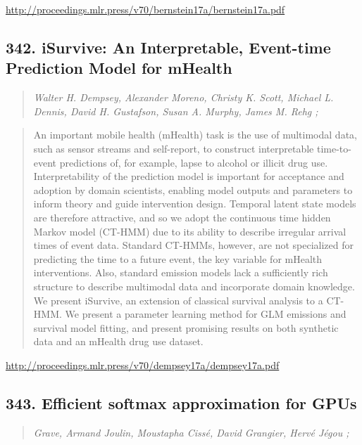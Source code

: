\documentclass{article}
\begin{document}
\href{http://proceedings.mlr.press/v70/bernstein17a/bernstein17a.pdf}{http://proceedings.mlr.press/v70/bernstein17a/bernstein17a.pdf}

\subsection{342. iSurvive: An Interpretable, Event-time Prediction Model for mHealth}

\begin{quote}
\footnotesize{\textit{Walter H. Dempsey, Alexander Moreno, Christy K. Scott, Michael L. Dennis, David H. Gustafson, Susan A. Murphy, James M. Rehg ;}}

\end{quote}

\begin{quote}
    An important mobile health (mHealth) task is the use of multimodal data, such as sensor streams and self-report, to construct interpretable time-to-event predictions of, for example, lapse to alcohol or illicit drug use. Interpretability of the prediction model is important for acceptance and adoption by domain scientists, enabling model outputs and parameters to inform theory and guide intervention design. Temporal latent state models are therefore attractive, and so we adopt the continuous time hidden Markov model (CT-HMM) due to its ability to describe irregular arrival times of event data. Standard CT-HMMs, however, are not specialized for predicting the time to a future event, the key variable for mHealth interventions. Also, standard emission models lack a sufficiently rich structure to describe multimodal data and incorporate domain knowledge. We present iSurvive, an extension of classical survival analysis to a CT-HMM. We present a parameter learning method for GLM emissions and survival model fitting, and present promising results on both synthetic data and an mHealth drug use dataset.  
\end{quote}

\href{http://proceedings.mlr.press/v70/dempsey17a/dempsey17a.pdf}{http://proceedings.mlr.press/v70/dempsey17a/dempsey17a.pdf}

\subsection{343. Efficient softmax approximation for GPUs}

\begin{quote}
\footnotesize{\textit{Grave, Armand Joulin, Moustapha Cissé, David Grangier, Hervé Jégou ;}}

\end{quote}
\end{document}

